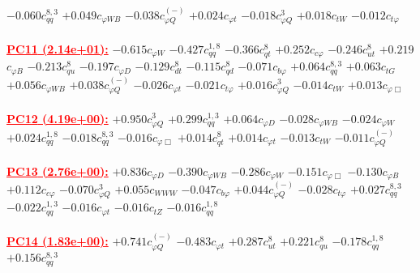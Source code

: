 \documentclass{article}
\begin{document}
{$-0.060$}{\rm $c_{qq}^{8,3}$}
{$+0.049$}{\rm $c_{\varphi WB}$}
{$-0.038$}{\rm $c_{\varphi Q}^{(-)}$}
{$+0.024$}{\rm $c_{\varphi t}$}
{$-0.018$}{\rm $c_{\varphi Q}^{3}$}
{$+0.018$}{\rm $c_{tW}$}
{$-0.012$}{\rm $c_{t \varphi}$}
 \nonumber \\ \nonumber \\
\noindent \textcolor{red}{\underline{\bf{PC11} (2.14e+01):}}
{$-0.615$}{\rm $c_{\varphi W}$}
{$-0.427$}{\rm $c_{qq}^{1,8}$}
{$-0.366$}{\rm $c_{qt}^{8}$}
{$+0.252$}{\rm $c_{c \varphi}$}
{$-0.246$}{\rm $c_{ut}^{8}$}
{$+0.219$}{\rm $c_{\varphi B}$}
{$-0.213$}{\rm $c_{qu}^{8}$}
{$-0.197$}{\rm $c_{\varphi D}$}
{$-0.129$}{\rm $c_{dt}^{8}$}
{$-0.115$}{\rm $c_{qd}^{8}$}
{$-0.071$}{\rm $c_{b \varphi}$}
{$+0.064$}{\rm $c_{qq}^{8,3}$}
{$+0.063$}{\rm $c_{tG}$}
{$+0.056$}{\rm $c_{\varphi WB}$}
{$+0.038$}{\rm $c_{\varphi Q}^{(-)}$}
{$-0.026$}{\rm $c_{\varphi t}$}
{$-0.021$}{\rm $c_{t \varphi}$}
{$+0.016$}{\rm $c_{\varphi Q}^{3}$}
{$-0.014$}{\rm $c_{tW}$}
{$+0.013$}{\rm $c_{\varphi \Box}$}
 \nonumber \\ \nonumber \\
\noindent \textcolor{red}{\underline{\bf{PC12} (4.19e+00):}}
{$+0.950$}{\rm $c_{\varphi Q}^{3}$}
{$+0.299$}{\rm $c_{qq}^{1,3}$}
{$+0.064$}{\rm $c_{\varphi D}$}
{$-0.028$}{\rm $c_{\varphi WB}$}
{$-0.024$}{\rm $c_{\varphi W}$}
{$+0.024$}{\rm $c_{qq}^{1,8}$}
{$-0.018$}{\rm $c_{qq}^{8,3}$}
{$-0.016$}{\rm $c_{\varphi \Box}$}
{$+0.014$}{\rm $c_{qt}^{8}$}
{$+0.014$}{\rm $c_{\varphi t}$}
{$-0.013$}{\rm $c_{tW}$}
{$-0.011$}{\rm $c_{\varphi Q}^{(-)}$}
 \nonumber \\ \nonumber \\
\noindent \textcolor{red}{\underline{\bf{PC13} (2.76e+00):}}
{$+0.836$}{\rm $c_{\varphi D}$}
{$-0.390$}{\rm $c_{\varphi WB}$}
{$-0.286$}{\rm $c_{\varphi W}$}
{$-0.151$}{\rm $c_{\varphi \Box}$}
{$-0.130$}{\rm $c_{\varphi B}$}
{$+0.112$}{\rm $c_{c \varphi}$}
{$-0.070$}{\rm $c_{\varphi Q}^{3}$}
{$+0.055$}{\rm $c_{WWW}$}
{$-0.047$}{\rm $c_{b \varphi}$}
{$+0.044$}{\rm $c_{\varphi Q}^{(-)}$}
{$-0.028$}{\rm $c_{t \varphi}$}
{$+0.027$}{\rm $c_{qq}^{8,3}$}
{$-0.022$}{\rm $c_{qq}^{1,3}$}
{$-0.016$}{\rm $c_{\varphi t}$}
{$-0.016$}{\rm $c_{tZ}$}
{$-0.016$}{\rm $c_{qq}^{1,8}$}
 \nonumber \\ \nonumber \\
\noindent \textcolor{red}{\underline{\bf{PC14} (1.83e+00):}}
{$+0.741$}{\rm $c_{\varphi Q}^{(-)}$}
{$-0.483$}{\rm $c_{\varphi t}$}
{$+0.287$}{\rm $c_{ut}^{8}$}
{$+0.221$}{\rm $c_{qu}^{8}$}
{$-0.178$}{\rm $c_{qq}^{1,8}$}
{$+0.156$}{\rm $c_{qq}^{8,3}$}
\end{document}
